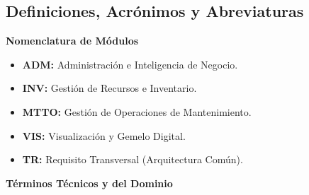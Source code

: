 \subsection{Definiciones, Acrónimos y Abreviaturas}

\textbf{Nomenclatura de Módulos}

\begin{itemize}
    \item \textbf{ADM:} Administración e Inteligencia de Negocio.
    \item \textbf{INV:} Gestión de Recursos e Inventario.
    \item \textbf{MTTO:} Gestión de Operaciones de Mantenimiento.
    \item \textbf{VIS:} Visualización y Gemelo Digital.
    \item \textbf{TR:} Requisito Transversal (Arquitectura Común).
\end{itemize}
\textbf{Términos Técnicos y del Dominio}

